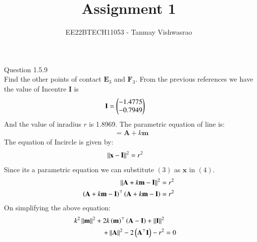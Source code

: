\documentclass[journal,12pt,twocolumn]{IEEEtran}
\theoremstyle{remark}
\begin{document}
\let\vec\mathbf





\vspace{3cm}

\title{
Assignment 1
}
\author{ EE22BTECH11053 - Tanmay Vishwasrao%
	
}	

\maketitle

\newpage


\bigskip

\renewcommand{\thefigure}{\theenumi}
\renewcommand{\thetable}{\theenumi}
Question 1.5.9\\
Find the other points of contact $\vec{E}_3$ and $\vec{F}_3$.
\fi
\solution
From the previous references we have the value of Incentre $\vec{I}$ is
\begin{align}
\vec{I} &=\myvec{-1.4775\\-0.7949}
\end{align}
And the value of inradius $r$ is 1.8969. The parametric equation of line is:
\begin{align}
&= \vec{A}+k\vec{m}
\end{align}
The equation of Incircle is given by:
\begin{align}
\norm{\vec{x}-\vec{I}}^2 &= r^2
\end{align}
Since its a parametric equation we can substitute $(3)$ as $\vec{x}$ in $(4)$.
\begin{align}
\norm{\vec{A}+k\vec{m}-\vec{I}}^2 &= r^2 \\
\brak{\vec{A}+k\vec{m}-\vec{I}}^\top\brak{\vec{A}+k\vec{m}-\vec{I}} &= r^2
\end{align}
On simplifying the above equation:
\begin{align}
k^2\norm{\vec{m}}^2+2k\brak{\vec{m}}^\top\brak{\vec{A-I}}+\norm{\vec{I}}^2 \nonumber \\
+\norm{\vec{A}}^2-2\brak{\vec{A}^\top\vec{I}}-r^2 &= 0 \label{eq:equation8721}
\end{align}
\end{document}
